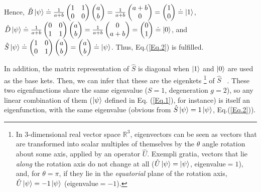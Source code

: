 \documentclass[11pt]{article}
\numberwithin{equation}{section} %
\numberwithin{figure}{section} %
\begin{document}
Hence, $\hat{B}\ket{\psi}\doteq \frac{1}{a+b}\begin{pmatrix} 1 & 1 \\ 0 & 0 \end{pmatrix}\begin{pmatrix} a \\ b \end{pmatrix}=\frac{1}{a+b}\begin{pmatrix} a+b \\ 0 \end{pmatrix}=\begin{pmatrix} 1 \\ 0 \end{pmatrix}\doteq\ket{1}$,$\,\,$ $\hat{D}\ket{\psi}\doteq \frac{1}{a+b}\begin{pmatrix} 0 & 0 \\ 1 & 1 \end{pmatrix}\begin{pmatrix} a \\ b \end{pmatrix}=\frac{1}{a+b}\begin{pmatrix} 0 \\ a+b \end{pmatrix}=\begin{pmatrix} 0 \\ 1 \end{pmatrix}\doteq\ket{0}$, and $\hat{S}\ket{\psi}\doteq \begin{pmatrix} 1 & 0 \\ 0 & 1 \end{pmatrix}\begin{pmatrix} a \\ b \end{pmatrix}=\begin{pmatrix} a \\ b \end{pmatrix}\doteq\ket{\psi}$. Thus, Eq.(\ref{Eq.2}) is fulfilled.\\

\vspace{0.3cm}

In addition, the matrix representation of $\hat{S}$ is diagonal when $\ket{1}$ and $\ket{0}$ are used as the base kets. Then, we can infer that these are the eigenkets 
\footnote{In $3$-dimensional real vector space $\mathbb{R}^3$, eigenvectors can be seen as vectors that are transformed into scalar multiples of themselves by the $\theta$ angle rotation about some axis, applied by an operator $\hat{U}$. Exempli gratia, vectors that lie \emph{along} the rotation axis do not change at all ($\hat{U}\ket{\psi}=\ket{\psi}$, eigenvalue$=1$), and, for $\theta=\pi$, if they lie in the \emph{equatorial} plane of the rotation axis, $\hat{U}\ket{\psi}=-1\ket{\psi}$ (eigenvalue$=-1$).}
 of $\hat{S}\,\,\,$ \cite[p.~22, l.~3-5 \& p.~36, l.~5-7]{Sakurai}. These two eigenfunctions share the same eigenvalue ($S=1$, degeneration $g=2$), so any linear combination of them ($\ket{\psi}$ defined in Eq. (\ref{Eq.1}), for instance) is itself an eigenfunction, with the same eigenvalue (obvious from $\hat{S}\ket{\psi}=1\ket{\psi}$, Eq.(\ref{Eq.2})). \cite[p.~102, l.~6-8]{Griffiths} \\
\end{document}
